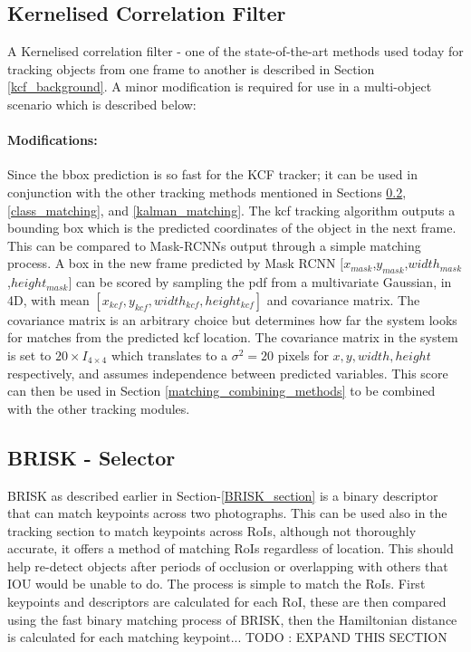 \documentclass[11pt,twoside]{report}
\begin{document}
\subsection{Kernelised Correlation Filter}
A Kernelised correlation filter - one of the state-of-the-art methods used today for tracking objects from one frame to another is described in Section \ref{kcf_background}. A minor modification is required for use in a multi-object scenario which is described below:

\paragraph{Modifications:}
Since the bbox prediction is so fast for the KCF tracker; it can be used in conjunction with the other tracking methods mentioned in Sections \ref{BRISK_matching}, \ref{class_matching}, and \ref{kalman_matching}. The kcf tracking algorithm outputs a bounding box which is the predicted coordinates of the object in the next frame. This can be compared to Mask-RCNNs output through a simple matching process. A box in the new frame predicted by Mask RCNN $[x_{mask}$,$y_{mask}$,$width_{mask}$,$height_{mask}]$ can be scored by sampling the pdf from a multivariate Gaussian, in 4D, with mean $[x_{kcf},y_{kcf},width_{kcf},height_{kcf}]$ and covariance matrix. The covariance matrix is an arbitrary choice but determines how far the system looks for matches from the predicted kcf location. The covariance matrix in the system is set to $20 \times I_{4 \times 4}$ which translates to a $\sigma^{2} = 20$ pixels for $x,y,width,height$ respectively, and assumes independence between predicted variables. This score can then be used in Section \ref{matching_combining_methods} to be combined with the other tracking modules.


\subsection{BRISK - Selector} \label{BRISK_matching}
BRISK as described earlier in Section-\ref{BRISK_section} is a binary descriptor that can match keypoints across two photographs. This can be used also in the tracking section to match keypoints across RoIs, although not thoroughly accurate, it offers a method of matching RoIs regardless of location. This should help re-detect objects after periods of occlusion or overlapping with others that IOU would be unable to do. The process is simple to match the RoIs. First keypoints and descriptors are calculated for each RoI, these are then compared using the fast binary matching process of BRISK, then the Hamiltonian distance is calculated for each matching keypoint...
TODO : EXPAND THIS SECTION
\end{document}
